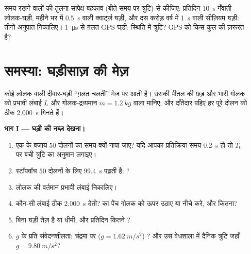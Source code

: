 \begin{exercise}[$\star\star\star$]\label{exo:g12:oscillators-and-time:15}
समय रखने वालों की तुलना सापेक्ष बहकाव (बीते समय पर त्रुटि) से कीजिए: प्रतिदिन
\qty{10}{s} गँवाती लोलक-घड़ी, महीने भर में \qty{0.5}{s} वाली क्वार्ट्ज़ घड़ी, और दस करोड़
वर्ष में \qty{1}{s} वाली सीज़ियम घड़ी: तीनों अनुपात निकालिए। \qty{1}{\micro s} से ग़लत GPS
घड़ी: स्थिति में त्रुटि? GPS को किस कुल की ज़रूरत है?
\end{exercise}

\section{समस्या: घड़ीसाज़ की मेज़}

\begin{problem}
\label{pb:g12:oscillators-and-time:1}
कोई लोलक वाली दीवार-घड़ी ``ग़लत चलती'' मेज़ पर आती है। उसकी पीतल की छड़ और भारी
गोलक को प्रभावी लंबाई $L$ और गोलक-द्रव्यमान $m = \qty{1.2}{kg}$ वाला  मानिए; और दाँतेदार पहिए हर पूरे दोलन को ठीक \qty{2.000}{s} गिनते हैं।

\medskip
\noindent\textbf{भाग I --- घड़ी की नब्ज़ देखना।}
\begin{enumerate}
  \item एक के बजाय $50$ दोलनों का समय क्यों नापा जाए? यदि आपका
        प्रतिक्रिया-समय \qty{0.2}{s} हो तो $T_0$ पर बची त्रुटि का अनुमान
        लगाइए।
  \item स्टॉपवॉच $50$ दोलनों के लिए \qty{99.4}{s} पढ़ती है: ?
  \item लोलक की वर्तमान प्रभावी लंबाई निकालिए।
  \item कौन-सी लंबाई ठीक \qty{2.000}{s} देती?  का पेंच गोलक को ऊपर उठाए या नीचे
        करे, और कितना?
  \item बिना  घड़ी तेज़ है या धीमी, और प्रतिदिन कितने ?
  \item $g$ के प्रति संवेदनशीलता: चंद्रमा पर ($g = \qty{1.62}{m/s^2}$)
        ? और उस वेधशाला में दैनिक त्रुटि जहाँ $g = \qty{9.80}{m/s^2}$?
\end{enumerate}


\end{problem}
